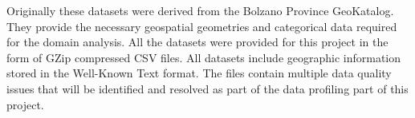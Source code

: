 Originally these datasets were derived from the Bolzano Province GeoKatalog. They provide the necessary geospatial geometries and categorical data required for the domain analysis. All the datasets were provided for this project in the form of GZip compressed CSV files. All datasets include geographic information stored in the Well-Known Text format. The files contain multiple data quality issues that will be identified and resolved as part of the data profiling part of this project.

